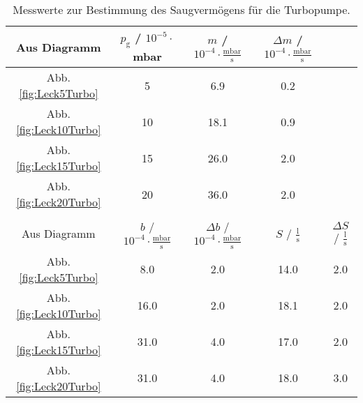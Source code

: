 \begin{table}[H]
   \caption{Messwerte zur Bestimmung des Saugvermögens für die Turbopumpe.}
   \label{tab:SaugLeckTurbo}
   \begin{tabular}{c|c|c|c|c}
     \toprule
     Aus Diagramm & $p_\text{g}$ / $10^{-5}\cdot$mbar & $m$ / $10^{-4}\cdot \frac{\text{mbar}}{\text{s}}$ & $\Delta m$ / $10^{-4}\cdot \frac{\text{mbar}}{\text{s}}$ \\
     \midrule
     Abb. \eqref{fig:Leck5Turbo}  & 5  & 6.9  & 0.2 \\
     Abb. \eqref{fig:Leck10Turbo} & 10 & 18.1 & 0.9 \\
     Abb. \eqref{fig:Leck15Turbo} & 15 & 26.0 & 2.0 \\
     Abb. \eqref{fig:Leck20Turbo} & 20 & 36.0 & 2.0 \\
     \multicolumn{5}{c}{}\\
     \toprule
     Aus Diagramm & $b$ / $10^{-4}\cdot \frac{\text{mbar}}{\text{s}}$ & $\Delta b$ / $10^{-4}\cdot \frac{\text{mbar}}{\text{s}}$ & $S$ / $\frac{\text{l}}{\text{s}}$ & $\Delta S$ / $\frac{\text{l}}{\text{s}}$ \\
     \midrule
     Abb. \eqref{fig:Leck5Turbo}  & 8.0 & 2.0 & 14.0 & 2.0 \\
     Abb. \eqref{fig:Leck10Turbo} & 16.0  & 2.0 & 18.1 & 2.0 \\
     Abb. \eqref{fig:Leck15Turbo} & 31.0  & 4.0 & 17.0 & 2.0 \\
     Abb. \eqref{fig:Leck20Turbo} & 31.0  & 4.0 & 18.0 & 3.0 \\
  \end{tabular}
\end{table}
